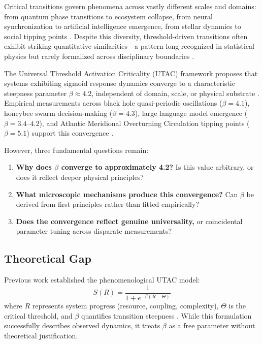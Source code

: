 \documentclass[11pt,letterpaper]{article}
\begin{document}
Critical transitions govern phenomena across vastly different scales and domains: from quantum phase transitions to ecosystem collapse, from neural synchronization to artificial intelligence emergence, from stellar dynamics to social tipping points \cite{Scheffer2009,Sethna2006,Anderson1972,Kadanoff2000}. Despite this diversity, threshold-driven transitions often exhibit striking quantitative similarities—a pattern long recognized in statistical physics but rarely formalized across disciplinary boundaries \cite{Stanley1971,Binney1992,Cardy1996}.

The Universal Threshold Activation Criticality (UTAC) framework proposes that systems exhibiting sigmoid response dynamics converge to a characteristic steepness parameter $\beta \approx 4.2$, independent of domain, scale, or physical substrate \cite{Romer2024}. Empirical measurements across black hole quasi-periodic oscillations ($\beta = 4.1$), honeybee swarm decision-making ($\beta = 4.3$), large language model emergence ($\beta = 3.4$--$4.2$), and Atlantic Meridional Overturning Circulation tipping points ($\beta = 5.1$) support this convergence \cite{Remillard2006,Seeley2012,Wei2022,Lenton2008}.

However, three fundamental questions remain:
\begin{enumerate}
    \item \textbf{Why does $\beta$ converge to approximately 4.2?} Is this value arbitrary, or does it reflect deeper physical principles?
    \item \textbf{What microscopic mechanisms produce this convergence?} Can $\beta$ be derived from first principles rather than fitted empirically?
    \item \textbf{Does the convergence reflect genuine universality,} or coincidental parameter tuning across disparate measurements?
\end{enumerate}

\subsection{Theoretical Gap}

Previous work established the phenomenological UTAC model:
\begin{equation}
S(R) = \frac{1}{1 + e^{-\beta(R - \Theta)}}
\label{eq:utac}
\end{equation}
where $R$ represents system progress (resource, coupling, complexity), $\Theta$ is the critical threshold, and $\beta$ quantifies transition steepness \cite{Romer2024}. While this formulation successfully describes observed dynamics, it treats $\beta$ as a free parameter without theoretical justification.
\end{document}
